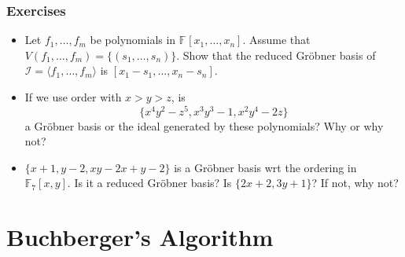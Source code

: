 \documentclass[9pt]{beamer}
\newcommand{\memph}[1]{{\color{yellow9}{\bf #1}}\xspace}
\newcommand{\F}[1][]{\ensuremath{\mathbb{F}_{#1}}\xspace}
\newcommand{\I}{\ensuremath{\mathcal{I}}\xspace}
\newcommand{\gens}{\ensuremath{x_1,\dots,x_{n}}\xspace}
\newcommand{\ideal}[1]{\ensuremath{\langle #1\rangle}\xspace}
\begin{document}
\begin{frame}
\frametitle{Exercises}
 
\begin{itemize}
 \item Let $f_1,\dots,f_m$ be polynomials in $\F{}[\gens]$. Assume that $V(f_1,\dots,f_m) = \{(s_1,\dots,s_n)\}$. Show that the reduced Gröbner basis of $\I = \ideal{f_1,\dots,f_m}$ is $[x_1 - s_1, \dots, x_n - s_n]$.
 \item If we use \memph{degrevlex} order with $x > y > z$, is \[\{x^4 y^2 - z^5 , x^3 y^3 − 1, x^2 y^4 − 2z\}\] a Gröbner basis or the ideal generated by these polynomials? Why or why not?
 \item $\{x + 1, y - 2, xy - 2x + y - 2\}$ is a Gröbner basis wrt the \memph{degrevlex} ordering in $\F[7][x,y]$. Is it a reduced Gröbner basis? Is $\{2x + 2, 3y + 1\}$? If not, why not?
\end{itemize}


\end{frame}

\section{Buchberger's Algorithm}
\end{document}
